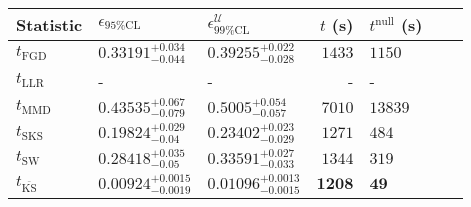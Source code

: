 \begin{tabular}{l|llr|llr}
	Statistic & $\epsilon_{95\%\mathrm{CL}}$ & $\epsilon^    {\mathcal{U}}_{99\%\mathrm{CL}}$ & $t$ (s) & $t^{\mathrm{null}}$ (s) \\
	\midrule
	$t_{\mathrm{FGD}}$ & $0.33191_{-0.044}^{+0.034}$ & $0.39255_{-0.028}^{+0.022}$ & $1433$ & $1150$ \\
	$t_{\mathrm{LLR}}$ & - & - & - & - \\
	$t_{\mathrm{MMD}}$ & $0.43535_{-0.079}^{+0.067}$ & $0.5005_{-0.057}^{+0.054}$ & $7010$ & $13839$ \\
	$t_{\mathrm{SKS}}$ & $0.19824_{-0.04}^{+0.029}$ & $0.23402_{-0.029}^{+0.023}$ & $1271$ & $484$ \\
	$t_{\mathrm{SW}}$ & $0.28418_{-0.05}^{+0.035}$ & $0.33591_{-0.033}^{+0.027}$ & $1344$ & $319$ \\
	$t_{\overline{\mathrm{KS}}}$ & ${\mathbf{0.00924_{-0.0019}^{+0.0015}}}$ & ${\mathbf{0.01096_{-0.0015}^{+0.0013}}}$ & ${\mathbf{1208}}$ & ${\mathbf{49}}$ \\
	\bottomrule
\end{tabular}